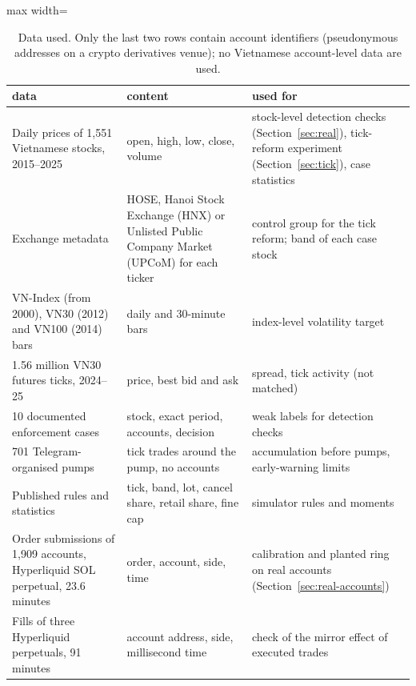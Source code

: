 \begin{table}[t]
\centering\footnotesize
\begin{adjustbox}{max width=\linewidth}
\begin{tabular}{p{4.2cm}p{4.3cm}p{5.2cm}}
\toprule
data & content & used for\\
\midrule
Daily prices of 1,551 Vietnamese stocks, 2015--2025 & open, high, low, close, volume & stock-level detection checks (Section~\ref{sec:real}), tick-reform experiment (Section~\ref{sec:tick}), case statistics\\
Exchange metadata & HOSE, Hanoi Stock Exchange (HNX) or Unlisted Public Company Market (UPCoM) for each ticker & control group for the tick reform; band of each case stock\\
VN-Index (from 2000), VN30 (2012) and VN100 (2014) bars & daily and 30-minute bars & index-level volatility target\\
1.56 million VN30 futures ticks, 2024--25 & price, best bid and ask & spread, tick activity (not matched)\\
10 documented enforcement cases & stock, exact period, accounts, decision & weak labels for detection checks\\
701 Telegram-organised pumps & tick trades around the pump, no accounts & accumulation before pumps, early-warning limits\\
Published rules and statistics & tick, band, lot, cancel share, retail share, fine cap & simulator rules and moments\\
Order submissions of 1,909 accounts, Hyperliquid SOL perpetual, 23.6 minutes & order, account, side, time & calibration and planted ring on real accounts (Section~\ref{sec:real-accounts})\\
Fills of three Hyperliquid perpetuals, 91 minutes & account address, side, millisecond time & check of the mirror effect of executed trades\\
\bottomrule
\end{tabular}
\end{adjustbox}
\caption{Data used. Only the last two rows contain account identifiers (pseudonymous addresses on a crypto derivatives venue); no Vietnamese account-level data are used.}\label{tab:data}
\end{table}

